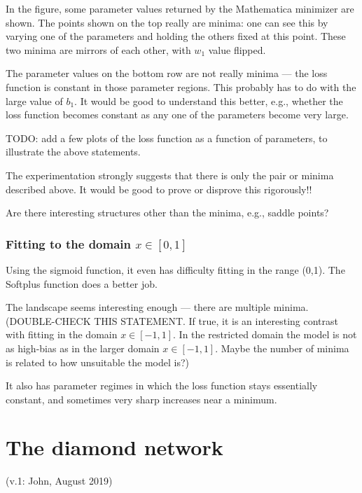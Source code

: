 \documentclass[12pt,a4paper]{article}
\begin{document}
In the figure, some parameter values returned by the Mathematica minimizer are shown.  The points
shown on the top really are minima: one can see this by varying one of the parameters and holding
the others fixed at this point.  These two minima are mirrors of each other, with $w_1$ value flipped.

The parameter values on the bottom row are not really minima --- the loss function is constant in
those parameter regions.  This probably has to do with the large value of $b_1$.  It would be good
to understand this better, e.g., whether the loss function becomes constant as any one of the
parameters become very large.  

TODO: add a few plots of the loss function as a function of parameters, to illustrate the above
statements.  

The experimentation strongly suggests that there is only the pair or minima described above.  It
would be good to prove or disprove this rigorously!!   

Are there interesting structures other than the minima, e.g., saddle points?  


\subsubsection{Fitting to the domain $x\in[0,1]$}

Using the sigmoid function, it even has difficulty fitting in the range (0,1).  The Softplus
function does a better job.

The landscape seems interesting enough --- there are multiple minima. (DOUBLE-CHECK THIS STATEMENT.
If true, it is an interesting contrast with fitting in the domain  $x\in[-1,1]$.  In the
restricted domain the model is not as high-bias as in the larger domain  $x\in[-1,1]$.  Maybe the
number of minima is related to how unsuitable the model is?)


It also has parameter regimes in which the loss function stays essentially constant, and sometimes
very sharp increases near a minimum.








\newpage

\section{The diamond network}

(v.1: John, August 2019)
\end{document}
